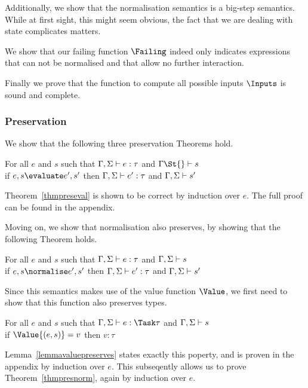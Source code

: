 Additionally, we show that the normalisation semantics is a big-step semantics.
While at first sight, this might seem obvious, the fact that we are dealing with
state complicates matters.

We show that our failing function $\Failing$ indeed only indicates expressions
that can not be normalised and that allow no further interaction.

Finally we prove that the function to compute all possible inputs $\Inputs$ is sound and complete.
\subsubsection{Preservation}

We show that the following three preservation Theorems hold.

\begin{theorem}
      For all $e$ and $s$ such that
      $\Gamma,\Sigma\vdash e:\tau$ and $\Gamma\St{}\infers s$\\
      if $e,s\evaluate e',s'$
      then $\Gamma,\Sigma\vdash e':\tau$ and $\Gamma,\Sigma\vdash s'$
      \label{thmpreseval}
\end{theorem}

Theorem~\ref{thmpreseval} is shown to be correct by induction over $e$. The full
proof can be found in the appendix.


Moving on, we show that normalisation also preserves, by showing that the
following Theorem holds.

\begin{theorem}
    For all $e$ and $s$ such that $\Gamma,\Sigma\vdash e:\tau$ and $\Gamma,\Sigma\vdash s$\\
    if   $e,s \normalise e',s'$ then $\Gamma,\Sigma\vdash e':\tau$ and $\Gamma,\Sigma\vdash s'$
    \label{thmpresnorm}
\end{theorem}

Since this semantics makes use of the value function $\Value$, we first need to
show that this function also preserves types.

\begin{lemma}
  For all $e$ and $s$ such that $\Gamma,\Sigma\infers e:\Task\tau$ and $\Gamma,\Sigma\vdash s$\\
  if $\Value{(e,s)}=v$ then $v:\tau$
  \label{lemmavaluepreserves}
\end{lemma}

Lemma~\ref{lemmavaluepreserves} states exactly this poperty, and is proven in the
appendix by induction over $e$. This subseqently allows us to prove
Theorem~\ref{thmpresnorm}, again by induction over $e$.

